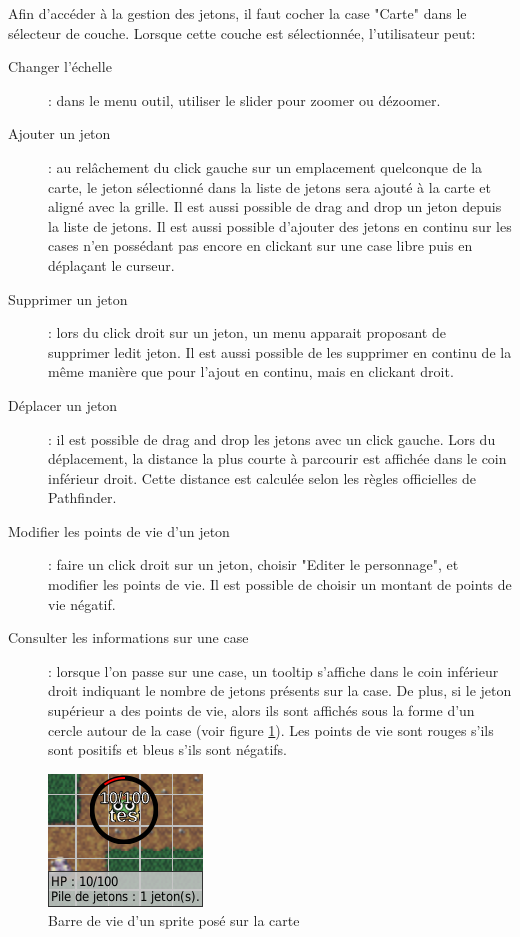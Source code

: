 Afin d'accéder à la gestion des jetons, il faut cocher la case "Carte" dans le sélecteur de couche. Lorsque cette couche est sélectionnée, l'utilisateur peut: 
\begin{description}
	\item[Changer l'échelle]: dans le menu outil, utiliser le slider pour zoomer ou dézoomer.
	\item[Ajouter un jeton]: au relâchement du click gauche sur un emplacement quelconque de la carte, le jeton sélectionné dans la liste de jetons sera ajouté à la carte et aligné avec la grille. Il est aussi possible de drag and drop un jeton depuis la liste de jetons. Il est aussi possible d'ajouter des jetons en continu sur les cases n'en possédant pas encore en clickant sur une case libre puis en déplaçant le curseur.
	\item[Supprimer un jeton]: lors du click droit sur un jeton, un menu apparait proposant de supprimer ledit jeton. Il est aussi possible de les supprimer en continu de la même manière que pour l'ajout en continu, mais en clickant droit.
	\item[Déplacer un jeton]: il est possible de drag and drop les jetons avec un click gauche. Lors du déplacement, la distance la plus courte à parcourir est affichée dans le coin inférieur droit. Cette distance est calculée selon les règles officielles de Pathfinder.
	\item[Modifier les points de vie d'un jeton]: faire un click droit sur un jeton, choisir "Editer le personnage", et modifier les points de vie. Il est possible de choisir un montant de points de vie négatif.
	\item[Consulter les informations sur une case]: lorsque l'on passe sur une case, un tooltip s'affiche dans le coin inférieur droit indiquant le nombre de jetons présents sur la case. De plus, si le jeton supérieur a des points de vie, alors ils sont affichés sous la forme d'un cercle autour de la case (voir figure \ref{fig:lifebar}). Les points de vie sont rouges s'ils sont positifs et bleus s'ils sont négatifs.
\end{description}

\begin{figure}[h!]
	\centering
	\includegraphics[scale=0.9]{img/gameobject_lifebar.png}
	\caption{Barre de vie d'un sprite posé sur la carte}
    \label{fig:lifebar}
\end{figure}


